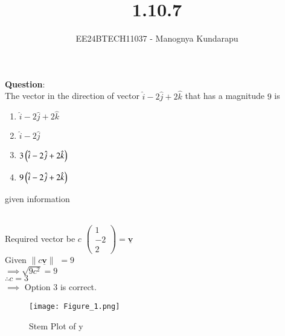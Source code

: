 \documentclass[journal]{IEEEtran}
\begin{document}

\vspace{3cm}

\title{1.10.7}
\author{EE24BTECH11037 - Manognya Kundarapu
}
{\let\newpage\relax\maketitle}

\renewcommand{\thefigure}{\theenumi}
\renewcommand{\thetable}{\theenumi}
\setlength{\intextsep}{10pt} %


\renewcommand{\thetable}{\theenumi}


\textbf{Question}:\\
The vector in the direction of vector $\hat{i} - 2\hat{j} + 2\hat{k}$ that has a magnitude $9$ is
\begin{enumerate}
\item $\hat{i} - 2\hat{j} + 2\hat{k}$
\item $\hat{i} - 2\hat{j}$
\item $3\left(\hat{i} - 2\hat{j} + 2\hat{k}\right)$
\item $9\left(\hat{i} - 2\hat{j} + 2\hat{k}\right)$
\end{enumerate}
\solution
\begin{table}[ht!]    
  \centering
  
  \caption{given information}
  \label{tab10.5.3.9.1}
\end{table}\\
Required vector be $c$ 
$\begin{pmatrix}
1\\
-2\\
2
\end{pmatrix} = \underline{\mathbf{v}}$\\
Given
$\| c\underline{\mathbf{v}} \|$ $= 9$\\
$ \implies \sqrt{9c^2} = 9 $\\
$ \therefore c=3$\\
$ \implies $ Option 3 is correct.

\begin{figure}[h!]
   \centering
   \texttt{[image: Figure\_1.png]}
   \caption{Stem Plot of y}
   \label{stemplot}
\end{figure}
\end{document}
